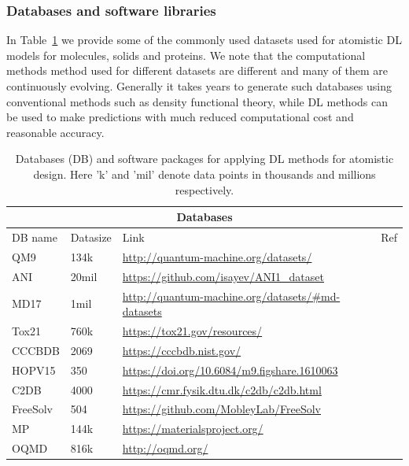 \documentclass[pdflatex,sn-mathphys]{sn-jnl}%
\theoremstyle{thmstyleone}%
\theoremstyle{thmstyletwo}%
\theoremstyle{thmstylethree}%
\begin{document}
 
 \subsubsection{Databases and software libraries}
In Table~\ref{tab:atomistic-deep-learning} we provide some of the commonly used datasets used for atomistic DL models for molecules, solids and proteins. We note that the computational methods method used for different datasets are different and many of them are continuously evolving. Generally it takes years to generate such databases using conventional methods such as density functional theory, while DL methods can be used to make predictions with much reduced computational cost and reasonable accuracy.

\begin{table}[hbt!]

\begin{minipage}{174pt}
\caption{\label{tab:atomistic-deep-learning}Databases (DB) and software packages for applying DL methods for atomistic design. Here 'k' and 'mil' denote data points in thousands and millions respectively.}
\begin{tabular}{@{}llll@{}}
\toprule
\multicolumn{4}{c}{Databases} \\
\midrule
DB name & Datasize & Link & Ref\\
\midrule
QM9   &  134k   & \url{http://quantum-machine.org/datasets/} & \cite{ramakrishnan2014quantum}  \\
ANI   &  20mil  & \url{https://github.com/isayev/ANI1_dataset} & \cite{smith2017ani}  \\
MD17   &  1mil   & \url{http://quantum-machine.org/datasets/#md-datasets} & \cite{chmiela2017machine}  \\
Tox21   &  760k & \url{https://tox21.gov/resources/}   & \cite{thomas2018us}  \\
CCCBDB   &  2069 & \url{https://cccbdb.nist.gov/}   & \cite{russell2005nist}  \\
HOPV15   &  350   & \url{https://doi.org/10.6084/m9.figshare.1610063} & \cite{lopez2016harvard}  \\
C2DB   &  4000 & \url{https://cmr.fysik.dtu.dk/c2db/c2db.html}   & \cite{johnson2006nist}  \\
FreeSolv   &  504 & \url{https://github.com/MobleyLab/FreeSolv}   & \cite{mobley2014freesolv}  \\
MP   &  144k & \url{https://materialsproject.org/}   & \cite{jain2013commentary}  \\
OQMD   &  816k & \url{http://oqmd.org/}   & \cite{kirklin2015open}  \\

\end{tabular}
\end{minipage}
\end{table}
\end{document}
